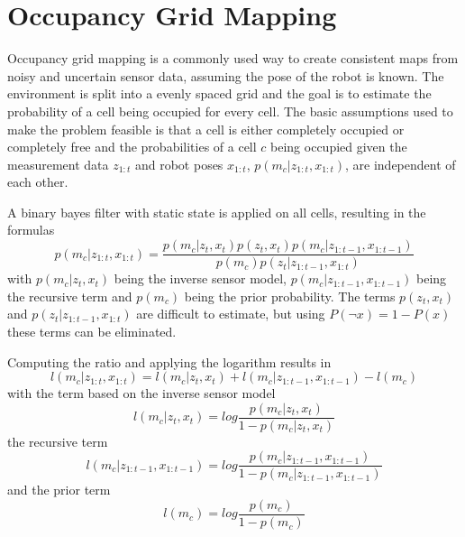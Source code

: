 \section{Occupancy Grid Mapping}

Occupancy grid mapping is a commonly used way to create consistent maps from noisy and uncertain sensor data, assuming the pose of the robot is known. The environment is split into a evenly spaced grid and the goal is to estimate the probability of a cell being occupied for every cell. The basic assumptions used to make the problem feasible is that a cell is either completely occupied or completely free and the probabilities of a cell $c$ being occupied given the measurement data $z_{1:t}$ and robot poses $x_{1:t}$, $p(m_c|z_{1:t},x_{1:t})$, are independent of each other. 

A binary bayes filter with static state is applied on all cells, resulting in the formulas 
\begin{equation} \label{eq4_1}
    p(m_c|z_{1:t},x_{1:t}) = \frac{p(m_c|z_t,x_t)p(z_t,x_t)p(m_c|z_{1:t-1},x_{1:t-1})}{p(m_c)p(z_t|z_{1:t-1},x_{1:t})}
\end{equation}
with $p(m_c|z_t,x_t)$ being the inverse sensor model, $p(m_c|z_{1:t-1},x_{1:t-1})$ being the recursive term and $p(m_c)$ being the prior probability. The terms $p(z_t,x_t)$ and $p(z_t|z_{1:t-1},x_{1:t})$ are difficult to estimate, but using $P(\neg x) = 1-P(x)$ these terms can be eliminated. 

Computing the ratio and applying the logarithm results in
\begin{equation} \label{eq4_2}
    l(m_c|z_{1:t},x_{1:t}) = l(m_c|z_{t},x_{t}) + l(m_c|z_{1:t-1},x_{1:t-1}) - l(m_c)
\end{equation}
with the term based on the inverse sensor model
\begin{equation} \label{eq4_3}
    l(m_c|z_{t},x_{t}) = log\frac{p(m_c|z_t,x_t)}{1-p(m_c|z_t,x_t)}
\end{equation}
the recursive term
\begin{equation} \label{eq4_4}
    l(m_c|z_{1:t-1},x_{1:t-1}) = log\frac{p(m_c|z_{1:t-1},x_{1:t-1})}{1-p(m_c|z_{1:t-1},x_{1:t-1})}
\end{equation}
and the prior term
\begin{equation} \label{eq4_5}
    l(m_c) = log\frac{p(m_c)}{1-p(m_c)}
\end{equation}


